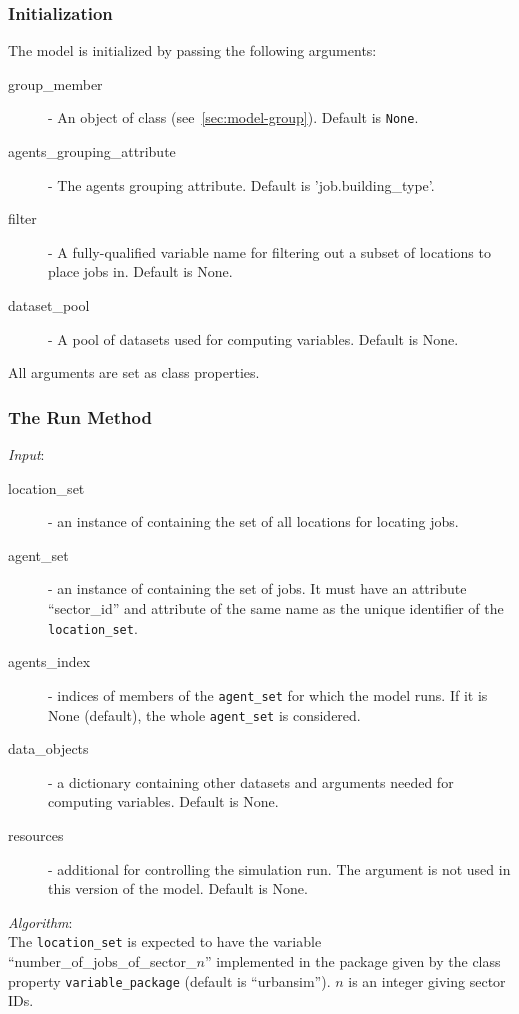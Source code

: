 \subsubsection{Initialization}
The model is initialized by passing the following arguments:
\begin{description}
\item[group_member] - An object of class  
  (see~\ref{sec:model-group}). Default is \verb|None|.
\item[agents_grouping_attribute] - The agents grouping attribute. Default is 'job.building_type'.
\item[filter] - A fully-qualified variable name for filtering out a subset of locations to place jobs in. Default is None.
\item[dataset_pool] - A pool of datasets used for computing variables. Default is None.
\end{description}
All arguments are set as class properties.

\subsubsection{The Run Method}
%
{\it Input}:
\begin{description}
\item[location_set] - an instance of  containing the set of all
  locations for locating jobs.
\item[agent_set] - an instance of  containing the set of
  jobs. It must have an attribute ``sector_id'' and attribute of the same name
  as the unique identifier of the \verb|location_set|.
\item[agents_index] - indices of members of the \verb|agent_set| for which the
  model runs. If it is None (default), the whole \verb|agent_set| is considered.
\item[data_objects] - a dictionary containing other datasets and arguments
  needed for computing variables. Default is None.
\item[resources] - additional  for controlling the
  simulation run. The argument is not used in this version of the model. Default is None.
\end{description}

{\it Algorithm}:~\\[1mm]
The \verb|location_set| is expected to have the variable
``number_of_jobs_of_sector_$n$'' implemented in the package
given by the class property \verb|variable_package| (default is
``urbansim'').  $n$ is an integer giving sector IDs.

